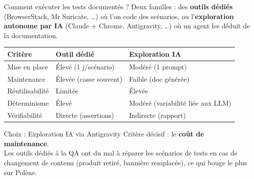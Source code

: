 \begin{frame}{Comment exécuter les tests documentés ?}
  \footnotesize Deux familles : des \textbf{outils dédiés} (BrowserStack, Mr Suricate, \dots) où l'on code des scénarios, ou l'\textbf{exploration autonome par IA} (Claude + Chrome, Antigravity, \dots) où un agent les déduit de la documentation.
  \vskip 4pt
  \scriptsize
  \begin{center}
  \begin{tabular}{lll}
    \toprule
    \textbf{Critère} & \textbf{Outil dédié} & \textbf{Exploration IA} \\
    \midrule
    Mise en place   & Élevé (1 j/scénario)     & Modéré (1 prompt) \\
    Maintenance     & Élevée (casse souvent)   & Faible (doc générée) \\
    Réutilisabilité & Limitée                  & Élevée \\
    Déterminisme    & Élevé                    & Modéré (variabilité liée aux LLM) \\
    Vérifiabilité   & Directe (assertions)     & Indirecte (rapport) \\
    \bottomrule
  \end{tabular}
  \end{center}
  \vskip 2pt
  \begin{block}{Choix : Exploration IA via Antigravity}
    \footnotesize Critère décisif : le \textbf{coût de maintenance}. \\Les outils dédiés à la QA ont du mal à réparer les scénarios de tests en cas de changement de contenu (produit retiré, bannière remplacée), ce qui bouge le plus sur Polène.
  \end{block}
\end{frame}

